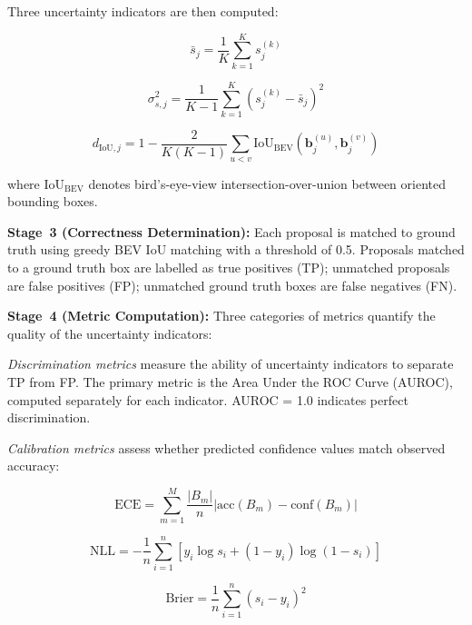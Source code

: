 \documentclass[conference]{IEEEtran}
\begin{document}
Three uncertainty indicators are then computed:

\begin{equation}
\bar{s}_j = \frac{1}{K} \sum_{k=1}^{K} s^{(k)}_j
\label{eq:mean_conf}
\end{equation}

\begin{equation}
\sigma^2_{s,j} = \frac{1}{K-1} \sum_{k=1}^{K} \left(s^{(k)}_j - \bar{s}_j\right)^2
\label{eq:conf_var}
\end{equation}

\begin{equation}
d_{\text{IoU},j} = 1 - \frac{2}{K(K-1)} \sum_{u < v} \text{IoU}_{\text{BEV}}\left(\mathbf{b}^{(u)}_j, \mathbf{b}^{(v)}_j\right)
\label{eq:geo_disagree}
\end{equation}

where $\text{IoU}_{\text{BEV}}$ denotes bird's-eye-view intersection-over-union between oriented bounding boxes.

\textbf{Stage~3 (Correctness Determination):} Each proposal is matched to ground truth using greedy BEV IoU matching with a threshold of 0.5. Proposals matched to a ground truth box are labelled as true positives (TP); unmatched proposals are false positives (FP); unmatched ground truth boxes are false negatives (FN).

\textbf{Stage~4 (Metric Computation):} Three categories of metrics quantify the quality of the uncertainty indicators:

\emph{Discrimination metrics} measure the ability of uncertainty indicators to separate TP from FP. The primary metric is the Area Under the ROC Curve (AUROC), computed separately for each indicator. AUROC = 1.0 indicates perfect discrimination.

\emph{Calibration metrics} assess whether predicted confidence values match observed accuracy:

\begin{equation}
\text{ECE} = \sum_{m=1}^{M} \frac{|B_m|}{n} \left| \text{acc}(B_m) - \text{conf}(B_m) \right|
\label{eq:ece}
\end{equation}

\begin{equation}
\text{NLL} = -\frac{1}{n} \sum_{i=1}^{n} \left[ y_i \log s_i + (1-y_i) \log(1-s_i) \right]
\label{eq:nll}
\end{equation}

\begin{equation}
\text{Brier} = \frac{1}{n} \sum_{i=1}^{n} (s_i - y_i)^2
\label{eq:brier}
\end{equation}
\end{document}
